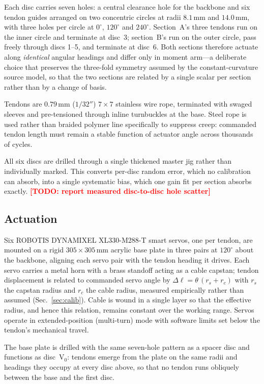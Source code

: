 \documentclass[letterpaper, 10pt, conference]{ieeeconf}
\newcommand{\todo}[1]{\textcolor{red}{\textbf{[TODO: #1]}}}
\begin{document}
Each disc carries seven holes: a central clearance hole for the backbone and
six tendon guides arranged on two concentric circles at radii $8.1\,$mm and
$14.0\,$mm, with three holes per circle at $0^\circ$, $120^\circ$ and
$240^\circ$. Section~A's three tendons run on the inner circle and terminate
at disc~3; section~B's run on the outer circle, pass freely through discs 1--5,
and terminate at disc~6. Both sections therefore actuate along
\emph{identical} angular headings and differ only in moment arm---a
deliberate choice that preserves the three-fold symmetry assumed by the
constant-curvature source model, so that the two sections are related by a
single scalar per section rather than by a change of basis.

Tendons are $0.79\,$mm ($1/32''$) $7\times7$ stainless wire rope, terminated
with swaged sleeves and pre-tensioned through inline turnbuckles at the base.
Steel rope is used rather than braided polymer line specifically to suppress
creep: commanded tendon length must remain a stable function of actuator
angle across thousands of cycles.

All six discs are drilled through a single thickened master jig rather than
individually marked. This converts per-disc random error, which no
calibration can absorb, into a single systematic bias, which one gain fit per
section absorbs exactly. \todo{report measured disc-to-disc hole scatter}

\subsection{Actuation}

Six ROBOTIS DYNAMIXEL XL330-M288-T smart servos, one per tendon, are mounted
on a rigid $305\times305\,$mm acrylic base plate in three pairs at $120^\circ$
about the backbone, aligning each servo pair with the tendon heading it
drives. Each servo carries a metal horn with a brass standoff acting as a
cable capstan; tendon displacement is related to commanded servo angle by
$\Delta \ell = \theta\,(r_{s} + r_{c})$ with $r_{s}$ the capstan radius and
$r_{c}$ the cable radius, measured empirically rather than assumed
(Sec.~\ref{sec:calib}). Cable is wound in a single layer so that the
effective radius, and hence this relation, remains constant over the working
range. Servos operate in extended-position (multi-turn) mode with software
limits set below the tendon's mechanical travel.

The base plate is drilled with the same seven-hole pattern as a spacer disc
and functions as disc~V$_0$: tendons emerge from the plate on the same radii
and headings they occupy at every disc above, so that no tendon runs obliquely
between the base and the first disc.
\end{document}
